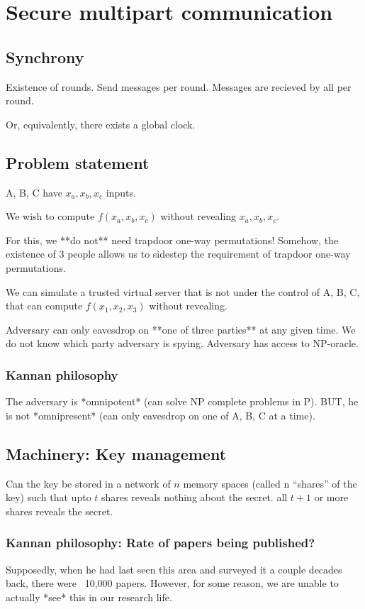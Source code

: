 \section{Secure multipart communication}

\subsection{Synchrony}
Existence of rounds. Send messages per round. Messages are
recieved by all per round.

Or, equivalently, there exists a global clock.

\subsection{Problem statement}

A, B, C have $x_a, x_b, x_c$ inputs.

We wish to compute $f(x_a, x_b, x_c)$ without revealing $x_a, x_b, x_c$.

For this, we **do not** need trapdoor one-way permutations!
Somehow, the existence of 3 people allows us to sidestep the
requirement of trapdoor one-way permutations.

We can simulate a trusted virtual server that is not under the control of
A, B, C, that can compute $f(x_1, x_2, x_3)$ without revealing.

Adversary can only eavesdrop on **one of three parties** at any given time.
We do not know which party adversary is spying. Adversary has access to NP-oracle.

\subsubsection{Kannan philosophy}
The adversary is *omnipotent* (can solve NP complete problems in P). BUT, he
is not *omnipresent* (can only eavesdrop on one of A, B, C at a time).


\subsection{Machinery: Key management}

Can the key be stored in a network of $n$ memory spaces (called n ``shares'' of the key)
such that upto $t$ shares reveals nothing about the secret. all $t + 1$ or more shares
reveals the secret.

\subsubsection{Kannan philosophy: Rate of papers being published?}
Supposedly, when he had last seen this area and surveyed it a couple decades back, there were ~10,000 papers.
However, for some reason, we are unable to actually *see* this in our research life.

